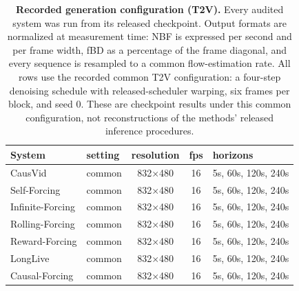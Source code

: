 \begin{table}[tb]
\centering
\small
\setlength{\tabcolsep}{5pt}
\begin{tabular}{l l c c l}
\toprule
System & setting & resolution & fps & horizons \\
\midrule
CausVid & common & 832$\times$480 & 16 & 5s, 60s, 120s, 240s \\
Self-Forcing & common & 832$\times$480 & 16 & 5s, 60s, 120s, 240s \\
Infinite-Forcing & common & 832$\times$480 & 16 & 5s, 60s, 120s, 240s \\
Rolling-Forcing & common & 832$\times$480 & 16 & 5s, 60s, 120s, 240s \\
Reward-Forcing & common & 832$\times$480 & 16 & 5s, 60s, 120s, 240s \\
LongLive & common & 832$\times$480 & 16 & 5s, 60s, 120s, 240s \\
Causal-Forcing & common & 832$\times$480 & 16 & 5s, 60s, 120s, 240s \\
\bottomrule
\end{tabular}
\caption{\textbf{Recorded generation configuration (T2V).} Every audited system was run from its released checkpoint. Output formats are normalized at measurement time: NBF is expressed per second and per frame width, fBD as a percentage of the frame diagonal, and every sequence is resampled to a common flow-estimation rate. All rows use the recorded common T2V configuration: a four-step denoising schedule with released-scheduler warping, six frames per block, and seed $0$. These are checkpoint results under this common configuration, not reconstructions of the methods' released inference procedures.}
\label{tab:native_config}
\end{table}